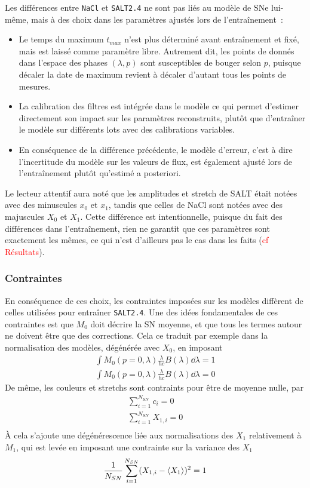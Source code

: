 \documentclass{book}
\def\nacl{\texttt{NaCl}\xspace}
\def\saltd{\texttt{SALT2.4}\xspace}
\begin{document}
Les différences entre \nacl et \saltd ne sont pas liés au modèle de SNe lui-même, mais à des choix dans les paramètres ajustés lors de l'entraînement~:
\begin{itemize}
\item Le temps du maximum $t_{max}$ n'est plus déterminé avant entraînement et fixé, mais est laissé comme paramètre libre. Autrement dit, les points de donnés dans l'espace des phases $(\lambda, p)$ sont susceptibles de bouger selon $p$, puisque décaler la date de maximum revient à décaler d'autant tous les points de mesures.
\item La calibration des filtres est intégrée dans le modèle ce qui permet d'estimer directement son impact sur les paramètres reconstruits, plutôt que d'entraîner le modèle sur différents lots avec des calibrations variables.
\item En conséquence de la différence précédente, le modèle d'erreur, c'est à dire l'incertitude du modèle sur les valeurs de flux, est également ajusté lors de l'entraînement plutôt qu'estimé a posteriori.
\end{itemize}
Le lecteur attentif aura noté que les amplitudes et stretch de SALT était notées avec des minuscules $x_0$ et $x_1$, tandis que celles de NaCl sont notées avec des majuscules $X_0$ et $X_1$. Cette différence est intentionnelle, puisque du fait des différences dans l'entraînement, rien ne garantit que ces paramètres sont exactement les mêmes, ce qui n'est d'ailleurs pas le cas dans les faits (\textcolor{red}{cf Résultats}).


\subsubsection{Contraintes}

En conséquence de ces choix, les contraintes imposées sur les modèles diffèrent de celles utilisées pour entraîner \saltd. Une des idées fondamentales de ces contraintes est que $M_0$ doit décrire la SN moyenne, et que tous les termes autour ne doivent être que des corrections. Cela ce traduit par exemple dans la normalisation des modèles, dégénérée avec $X_0$, en imposant
\begin{gather}
	\int M_0(p=0,\lambda) \frac{\lambda}{hc} B(\lambda) \dd{\lambda} = 1\\
	\int M_0(p=0,\lambda) \frac{\lambda}{hc} B(\lambda) \dd{\lambda} = 0
\end{gather}
De même, les couleurs et stretchs sont contraints pour être de moyenne nulle, par
\begin{gather}
	\sum_{i=1}^{N_{SN}} c_i = 0\\
	\sum_{i=1}^{N_{SN}} X_{1,i} = 0\\
\end{gather}
À cela s'ajoute une dégénérescence liée aux normalisations des $X_1$ relativement à $M_1$, qui est levée en imposant une contrainte sur la variance des $X_1$
\begin{gather}
	\frac{1}{N_{SN}} \sum_{i=1}^{N_{SN}} (X_{1,i} - \ev{X_1})^2 = 1
\end{gather}
\end{document}
